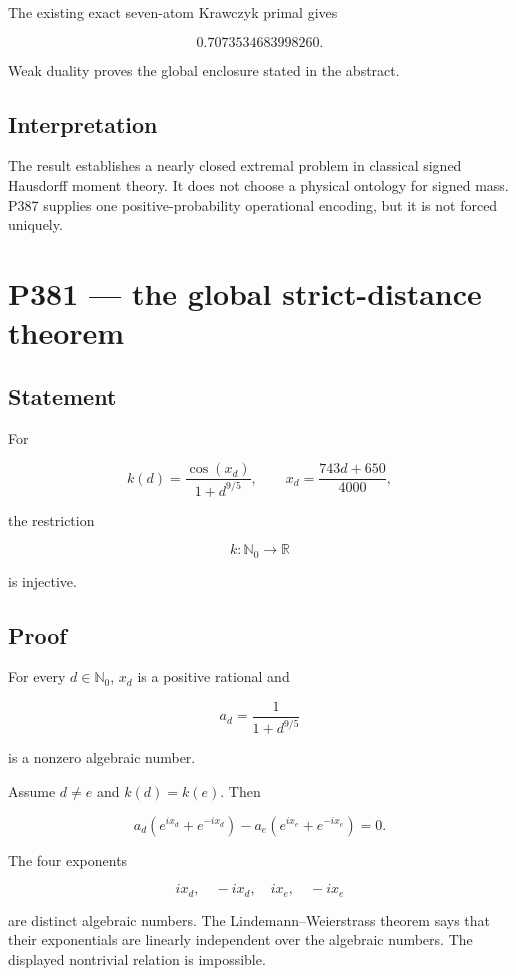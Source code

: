 \documentclass[11pt,a4paper,openany]{report}
\begin{document}
The existing exact seven-atom Krawczyk primal gives

\[
0.7073534683998260.
\]

Weak duality proves the global enclosure stated in the abstract.

\section{Interpretation}

The result establishes a nearly closed extremal problem in classical signed Hausdorff moment theory. It does not choose a physical ontology for signed mass. P387 supplies one positive-probability operational encoding, but it is not forced uniquely.

\chapter{P381 --- the global strict-distance theorem}

\section{Statement}

For

\[
k(d)=
\frac{\cos(x_d)}{1+d^{9/5}},
\qquad
x_d=\frac{743d+650}{4000},
\]

the restriction

\[
k:\mathbb N_0\longrightarrow\mathbb R
\]

is injective.

\section{Proof}

For every \(d\in\mathbb N_0\), \(x_d\) is a positive rational and

\[
a_d=\frac{1}{1+d^{9/5}}
\]

is a nonzero algebraic number.

Assume \(d\neq e\) and \(k(d)=k(e)\). Then

\[
a_d(e^{ix_d}+e^{-ix_d})
-
a_e(e^{ix_e}+e^{-ix_e})
=0.
\]

The four exponents

\[
ix_d,\quad -ix_d,\quad ix_e,\quad -ix_e
\]

are distinct algebraic numbers. The Lindemann--Weierstrass theorem says that their exponentials are linearly independent over the algebraic numbers. The displayed nontrivial relation is impossible.
\end{document}
